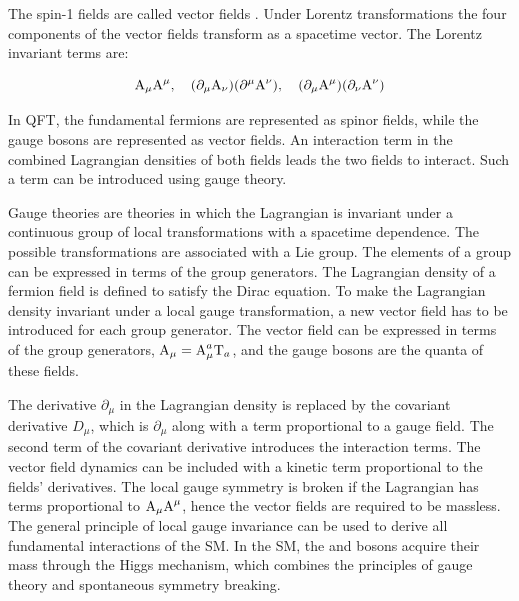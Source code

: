 The spin-1 fields are called vector fields \amu. Under Lorentz transformations the four components of the vector fields transform as a spacetime vector. The Lorentz invariant terms are:

\begin{equation}
  \text{A}_{\mu} \text{A}^{\mu}, \quad (\partial_{\mu} \text{A}_{\nu})(\partial^{\mu} \text{A}^{\nu}), \quad (\partial_{\mu} \text{A}^{\mu})(\partial_{\nu} \text{A}^{\nu})
\end{equation}

In QFT, the fundamental fermions are represented as spinor fields, while the gauge bosons are represented as vector fields. An interaction term in the combined Lagrangian densities of both fields leads the two fields to interact. Such a term can be introduced using gauge theory.

Gauge theories are theories in which the Lagrangian is invariant under a continuous group of local transformations with a spacetime dependence. The possible transformations are associated with a Lie group. The elements of a group can be expressed in terms of the group generators. The Lagrangian density of a fermion field is defined to satisfy the Dirac equation. To make the Lagrangian density invariant under a local gauge transformation, a new vector field \amu has to be introduced for each group generator. The vector field can be expressed in terms of the group generators, $\text{A}_{\mu}=\text{A}_{\mu}^{a} \text{T}_{a}$, and the gauge bosons are the quanta of these fields.

The derivative $\partial_{\mu}$ in the Lagrangian density is replaced by the covariant derivative $D_{\mu}$, which is $\partial_{\mu}$ along with a term proportional to a gauge field. The second term of the covariant derivative introduces the interaction terms. The vector field dynamics can be included with a kinetic term proportional to the fields' derivatives. The local gauge symmetry is broken if the Lagrangian has terms proportional to $\text{A}_{\mu} \text{A}^{\mu}$, hence the vector fields are required to be massless. The general principle of local gauge invariance can be used to derive all fundamental interactions of the SM. In the SM, the \PW and \PZ bosons acquire their mass through the Higgs mechanism, which combines the principles of gauge theory and spontaneous symmetry breaking.

